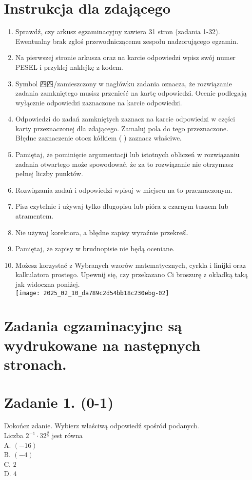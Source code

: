 \documentclass[10pt]{article}
\begin{document}
\section*{Instrukcja dla zdającego}
\begin{enumerate}
  \item Sprawdź, czy arkusz egzaminacyjny zawiera 31 stron (zadania 1-32). Ewentualny brak zgłoś przewodniczącemu zespołu nadzorującego egzamin.
  \item Na pierwszej stronie arkusza oraz na karcie odpowiedzi wpisz swój numer PESEL i przyklej naklejkę z kodem.
  \item Symbol 四四/zamieszczony w nagłówku zadania oznacza, że rozwiązanie zadania zamkniętego musisz przenieść na kartę odpowiedzi. Ocenie podlegają wyłącznie odpowiedzi zaznaczone na karcie odpowiedzi.
  \item Odpowiedzi do zadań zamkniętych zaznacz na karcie odpowiedzi w części karty przeznaczonej dla zdającego. Zamaluj pola do tego przeznaczone. Błędne zaznaczenie otocz kółkiem ( ) zaznacz właściwe.
  \item Pamiętaj, że pominięcie argumentacji lub istotnych obliczeń w rozwiązaniu zadania otwartego może spowodować, że za to rozwiązanie nie otrzymasz pełnej liczby punktów.
  \item Rozwiązania zadań i odpowiedzi wpisuj w miejscu na to przeznaczonym.
  \item Pisz czytelnie i używaj tylko długopisu lub pióra z czarnym tuszem lub atramentem.
  \item Nie używaj korektora, a błędne zapisy wyraźnie przekreśl.
  \item Pamiętaj, że zapisy w brudnopisie nie będą oceniane.
  \item Możesz korzystać z Wybranych wzorów matematycznych, cyrkla i linijki oraz kalkulatora prostego. Upewnij się, czy przekazano Ci broszurę z okładką taką jak widoczna poniżej.\\
\texttt{[image: 2025\_02\_10\_da789c2d54bb18c230ebg-02]}
\end{enumerate}

\section*{Zadania egzaminacyjne są wydrukowane na następnych stronach.}
\section*{Zadanie 1. (0-1)}
Dokończ zdanie. Wybierz właściwą odpowiedź spośród podanych.\\
Liczba \(2^{-1} \cdot 32^{\frac{3}{5}}\) jest równa\\
A. \((-16)\)\\
B. \((-4)\)\\
C. 2\\
D. 4
\end{document}
